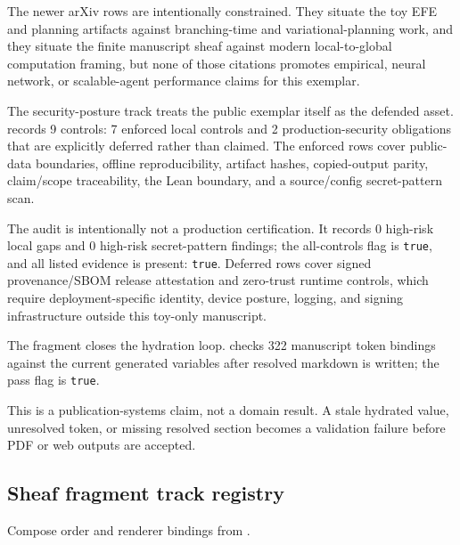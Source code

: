 \documentclass[
  english,
]{article}
\newcounter{none} %
\begin{document}
The newer arXiv rows are intentionally constrained. They situate the toy
EFE and planning artifacts against branching-time and
variational-planning work, and they situate the finite manuscript sheaf
against modern local-to-global computation framing, but none of those
citations promotes empirical, neural network, or scalable-agent
performance claims for this exemplar.

The security-posture track treats the public exemplar itself as the
defended asset. 
records 9 controls: 7 enforced local controls and 2 production-security
obligations that are explicitly deferred rather than claimed. The
enforced rows cover public-data boundaries, offline reproducibility,
artifact hashes, copied-output parity, claim/scope traceability, the
Lean boundary, and a source/config secret-pattern scan.

The audit is intentionally not a production certification. It records 0
high-risk local gaps and 0 high-risk secret-pattern findings; the
all-controls flag is \texttt{true}, and all listed evidence is present:
\texttt{true}. Deferred rows cover signed provenance/SBOM release
attestation and zero-trust runtime controls, which require
deployment-specific identity, device posture, logging, and signing
infrastructure outside this toy-only manuscript.

The  fragment closes the hydration loop.
 checks 322
manuscript token bindings against the current generated variables after
resolved markdown is written; the pass flag is \texttt{true}.

This is a publication-systems claim, not a domain result. A stale
hydrated value, unresolved token, or missing resolved section becomes a
validation failure before PDF or web outputs are accepted.

\subsection{Sheaf fragment track
registry}\label{sheaf-fragment-track-registry}

Compose order and renderer bindings from
.
\end{document}
